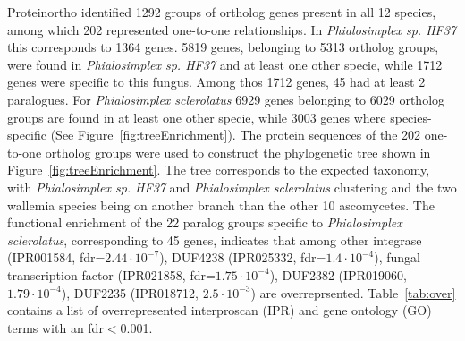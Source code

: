 \documentclass[fontsize=10pt, paper=a4,fleqn, ]{wlscirep}
\newif\ifcode
\newcommand{\E}[2]{${#1}\cdot10^{-{#2}}$}
\newcommand{\phiSp}{\textit{Phialosimplex sp. HF37}}
\newcommand{\phiScl}{\textit{Phialosimplex sclerolatus}}
\begin{document}
\ifcode
#check comparativeGenomics.snakemake
\end{listing}
\fi

%
%


Proteinortho identified 1292 groups of ortholog genes present in all
12 species, among which 202 represented one-to-one relationships. In
{\phiSp} this corresponds to 1364 genes. 5819 genes, belonging to 5313
ortholog groups, were found in {\phiSp} and at least one other specie,
while 1712 genes were specific to this fungus. Among thos 1712 genes,
45 had at least 2 paralogues. For {\phiScl} 6929
genes belonging to 6029 ortholog groups are found in at least one
other specie, while 3003 genes where species-specific (See
Figure~\ref{fig:treeEnrichment}). The protein sequences of the 202
one-to-one ortholog groups  were used to construct the phylogenetic
tree shown in Figure~\ref{fig:treeEnrichment}. The tree corresponds to
the expected taxonomy, with {\phiSp} and {\phiScl} clustering and the two
wallemia species being on another branch than the other 10
ascomycetes. The functional enrichment of the 22 paralog groups
specific to {\phiScl}, corresponding to 45 genes, indicates that among
other integrase (IPR001584, fdr=\E{2.44}{7}), DUF4238 (IPR025332,
fdr=\E{1.4}{4}), fungal transcription factor (IPR021858,
fdr=\E{1.75}{4}), DUF2382 (IPR019060, \E{1.79}{4}), DUF2235
(IPR018712, \E{2.5}{3}) are overreprsented. Table~\ref{tab:over}
contains a list of overrepresented interproscan (IPR) and gene
ontology (GO) terms with an fdr$<$0.001.
\end{document}
